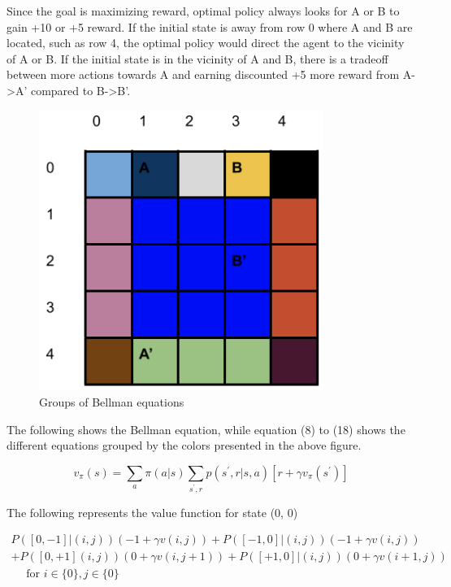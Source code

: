 \documentclass[11pt]{article}
\begin{document}
\noindent
Since the goal is maximizing reward, optimal policy always looks for A or B to
gain +10 or +5 reward. If the initial state is away from row 0 where A and B are
located, such as row 4, the optimal policy would direct the agent to the
vicinity of A or B. If the initial state is in the vicinity of A and B, there is
a tradeoff between more actions towards A and earning discounted +5 more reward
from A->A’ compared to B->B’.
\\

\begin{figure}[h]
\includegraphics[scale=0.4]{bellman_groups}
\centering
\caption{Groups of Bellman equations}
\end{figure}

\noindent
The following shows the Bellman equation, while equation (8) to (18) shows the different
equations grouped by the colors presented in the above figure.

\begin{equation}
v_{\pi}(s)=\sum_{a} \pi(a | s) \sum_{s^{\prime}, r} p\left(s^{\prime}, r | s, a\right)\left[r+\gamma v_{\pi}\left(s^{\prime}\right)\right]
\end{equation}


\noindent
The following represents the value function for state (0, 0)

\begin{equation}
\begin{array}{c}
{P([0,-1] |(i, j))(-1+\gamma v(i, j))+P([-1,0] |(i, j))(-1+\gamma v(i, j))} \\
{+P([0,+1](i, j))(0+\gamma v(i, j+1))+P([+1, 0] |(i, j))(0+\gamma v(i+1, j))} \\
{\quad \text { for } i \in\{0\}, j \in\{0\}}
\end{array}
\end{equation}
\end{document}
